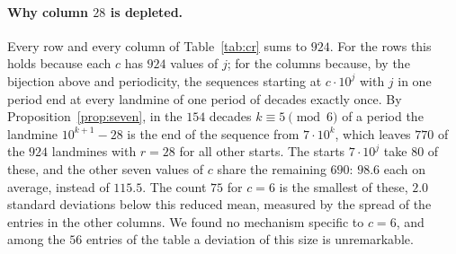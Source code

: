\paragraph{Why column $28$ is depleted.}
Every row and every column of Table~\ref{tab:cr} sums to $924$. For the rows this holds because each
$c$ has $924$ values of $j$; for the columns because, by the bijection above and periodicity, the
sequences starting at $c \cdot 10^j$ with $j$ in one period end at every landmine of one period of
decades exactly once. By Proposition~\ref{prop:seven}, in the $154$ decades $k \equiv 5 \pmod 6$ of a
period the landmine $10^{k+1} - 28$ is the end of the sequence from $7 \cdot 10^k$, which leaves
$770$ of the $924$ landmines with $r = 28$ for all other starts. The starts $7 \cdot 10^j$ take $80$
of these, and the other seven values of $c$ share the remaining $690$: $98.6$ each on average,
instead of $115.5$. The count $75$ for $c = 6$ is the smallest of these, $2.0$ standard deviations
below this reduced mean, measured by the spread of the entries in the other columns. We found no
mechanism specific to $c = 6$, and among the $56$ entries of the table a deviation of this size is
unremarkable.
